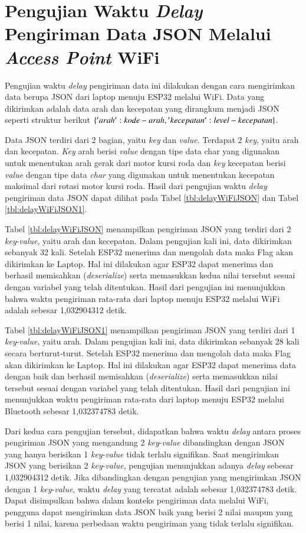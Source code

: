 \newpage

\section{Pengujian Waktu \emph{Delay} Pengiriman Data JSON Melalui \emph{Access Point} WiFi}
\label{sec:delayWiFiJSON}

Pengujian waktu \emph{delay} pengiriman data ini dilakukan dengan cara mengirimkan data berupa JSON dari laptop menuju ESP32 melalui WiFi. Data yang dikirimkan adalah data arah dan kecepatan yang dirangkum menjadi JSON seperti struktur berikut \(\{'arah': kode-arah, \\'kecepatan': level-kecepatan\}\). 

Data JSON terdiri dari 2 bagian, yaitu \emph{key} dan \emph{value}. Terdapat 2 \emph{key}, yaitu arah dan kecepatan. \emph{Key} arah berisi \emph{value} dengan tipe data char yang digunakan untuk menentukan arah gerak dari motor kursi roda dan \emph{key} kecepatan berisi \emph{value} dengan tipe data \emph{char} yang digunakan untuk menentukan kecepatan maksimal dari rotasi motor kursi roda. Hasil dari pengujian waktu \emph{delay} pengiriman data JSON dapat dilihat pada Tabel \ref{tbl:delayWiFiJSON} dan Tabel \ref{tbl:delayWiFiJSON1}.

Tabel \ref{tbl:delayWiFiJSON} menampilkan pengiriman JSON yang terdiri dari 2 \emph{key}-\emph{value}, yaitu arah dan kecepatan. Dalam pengujian kali ini, data dikirimkan sebanyak 32 kali. Setelah ESP32 menerima dan mengolah data maka Flag akan dikirimkan ke Laptop. Hal ini dilakukan agar ESP32 dapat menerima dan berhasil memisahkan (\emph{deserialize}) serta memasukkan kedua nilai tersebut sesuai dengan variabel yang telah ditentukan. Hasil dari pengujian ini menunjukkan bahwa waktu pengiriman rata-rata dari laptop menuju ESP32 melalui WiFi adalah sebesar 1,032904312 detik.

Tabel \ref{tbl:delayWiFiJSON1} menampilkan pengiriman JSON yang terdiri dari 1 \emph{key}-\emph{value}, yaitu arah. Dalam pengujian kali ini, data dikirimkan sebanyak 28 kali secara berturut-turut. Setelah ESP32 menerima dan mengolah data maka Flag akan dikirimkan ke Laptop. Hal ini dilakukan agar ESP32 dapat menerima data dengan baik dan berhasil memisahkan (\emph{deserialize}) serta memasukkan nilai tersebut sesuai dengan variabel yang telah ditentukan. Hasil dari pengujian ini menunjukkan waktu pengiriman rata-rata dari laptop menuju ESP32 melalui Bluetooth sebesar 1,032374783 detik.

Dari kedua cara pengujian tersebut, didapatkan bahwa waktu \emph{delay} antara proses pengiriman JSON yang mengandung 2 \emph{key}-\emph{value} dibandingkan dengan JSON yang hanya berisikan 1 \emph{key}-\emph{value} tidak terlalu signifikan. Saat mengirimkan JSON yang berisikan 2 \emph{key}-\emph{value}, pengujian menunjukkan adanya \emph{delay} sebesar 1,032904312 detik. Jika dibandingkan dengan pengujian yang mengirimkan JSON dengan 1 \emph{key}-\emph{value}, waktu \emph{delay} yang tercatat adalah sebesar 1,032374783 detik. Dapat disimpulkan bahwa dalam konteks pengiriman data melalui WiFi, pengguna dapat mengirimkan data JSON baik yang berisi 2 nilai maupun yang berisi 1 nilai, karena perbedaan waktu pengiriman yang tidak terlalu signifikan.

